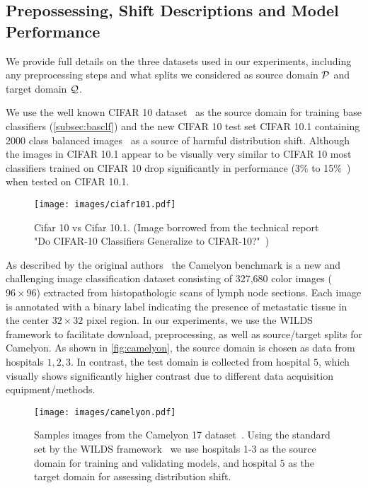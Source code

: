 \subsection{Prepossessing, Shift Descriptions and Model Performance}
\label{subsec:predata}
We provide full details on the three datasets used in our experiments, including any preprocessing steps and what splits we considered as source domain $\mathcal{P}$ and target domain $\mathcal{Q}$.

We use the well known CIFAR 10 dataset~\citep{krizhevsky2014cifar} as the source domain for training base classifiers (\autoref{subsec:basclf}) and the new CIFAR 10 test set CIFAR 10.1 containing 2000 class balanced images~\citep{cifar101} as a source of harmful distribution shift. Although the images in CIFAR 10.1 appear to be visually very similar to CIFAR 10 most classifiers trained on CIFAR 10 drop significantly in performance (3\% to 15\%~\citep{cifar101}) when tested on CIFAR 10.1.
\begin{figure}[!htb]
    \centering
    \texttt{[image: images/ciafr101.pdf]}
    \caption{Cifar 10 vs Cifar 10.1. (Image borrowed from the technical report "Do CIFAR-10 Classifiers Generalize to CIFAR-10?"~\citep{ciafr10101})}
    \label{fig:cifar101}
\end{figure}

As described by the original authors~\citep{camelyon} the Camelyon benchmark is a new and challenging image classification dataset consisting of 327,680 color images ($96 \times 96$) extracted from histopathologic scans of lymph node sections.
Each image is annotated with a binary label indicating the presence of metastatic tissue in the center $32\times 32$ pixel region.
In our experiments, we use the WILDS~\citep{wilds} framework to facilitate download, preprocessing, as well as source/target splits for Camelyon.
As shown in \autoref{fig:camelyon}, the source domain is chosen as data from hospitals $1,2,3$.
In contrast, the test domain is collected from hospital $5$, which visually shows significantly higher contrast due to different data acquisition equipment/methods.
\begin{figure}[!htb]
    \centering
    \hspace{-1cm}
    \texttt{[image: images/camelyon.pdf]}
    \caption{Samples images from the Camelyon 17 dataset~\citep{camelyon}. Using the standard set by the WILDS framework~\citep{wilds} we use hospitals 1-3 as the source domain for training and validating models, and hospital $5$ as the target domain for assessing distribution shift.}
    \label{fig:camelyon}
\end{figure}

